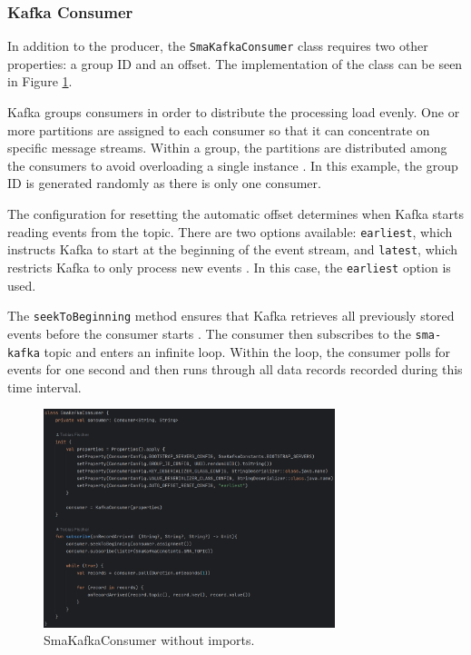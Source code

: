 \subsubsection{Kafka Consumer}

In addition to the producer, the \lstinline{SmaKafkaConsumer} class requires two other properties: a group ID and an offset. The implementation of the class can be seen in Figure \ref{fig:consumer}.

Kafka groups consumers in order to distribute the processing load evenly. One or more partitions are assigned to each consumer so that it can concentrate on specific message streams. Within a group, the partitions are distributed among the consumers to avoid overloading a single instance \cite{shapira2021kafka}. In this example, the group ID is generated randomly as there is only one consumer.

The configuration for resetting the automatic offset determines when Kafka starts reading events from the topic. There are two options available: \lstinline{earliest}, which instructs Kafka to start at the beginning of the event stream, and \lstinline{latest}, which restricts Kafka to only process new events \cite{kafkaDoc}. In this case, the \lstinline{earliest} option is used.

The \lstinline{seekToBeginning} method ensures that Kafka retrieves all previously stored events before the consumer starts \cite{kafkaDoc}. The consumer then subscribes to the \lstinline{sma-kafka} topic and enters an infinite loop. Within the loop, the consumer polls for events for one second and then runs through all data records recorded during this time interval.

\begin{figure}[ht]
    \centering
    \includegraphics[width=8.5cm]{images/consumer.png}
    \caption{SmaKafkaConsumer without imports.}
    \label{fig:consumer}
\end{figure}
